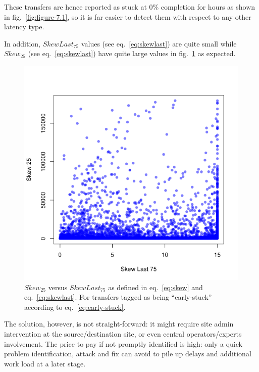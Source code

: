 These transfers are hence reported as stuck at 0\% completion for
hours as shown in fig.~\ref{fig:figure-7.1}, so it is far easier
to detect them with respect to any other latency type.

In addition, $SkewLast_{75}$ values (see eq.~\ref{eq:skewlast}) are
quite small while $Skew_{25}$ (see eq.~\ref{eq:skewlast}) have quite
large values in fig.~\ref{fig:figure-7.2} as expected.

\begin{figure}[htp]
\centering
\includegraphics{Figures/figure-72.pdf}
\caption{$Skew_{25}$ versus $SkewLast_{75}$ as defined in
  eq.~\ref{eq:skew} and eq.~\ref{eq:skewlast}. For transfers tagged as
  being ``early-stuck'' according to
  eq.~\ref{eq:early-stuck}.}\label{fig:figure-7.2}
\end{figure}

The solution, however, is not straight-forward: it might require site
admin intervention at the source/destination site, or even central
operators/experts involvement. The price to pay if not promptly
identified is high: only a quick problem identification, attack and
fix can avoid to pile up delays and additional work load at a later
stage.
